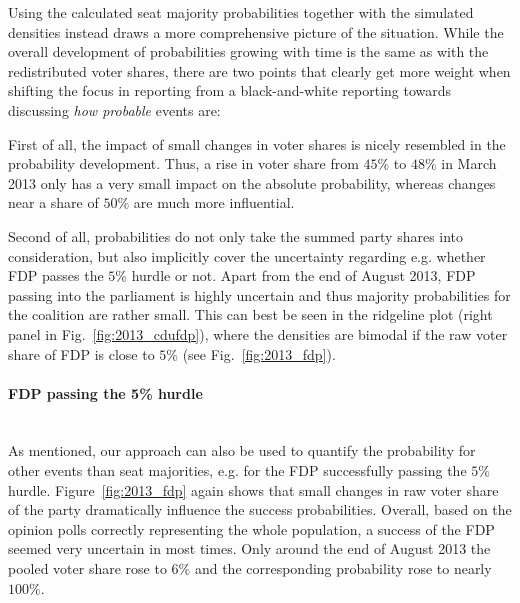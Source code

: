 \documentclass[smallcondensed]{svjour3}     %
\begin{document}
Using the calculated seat majority probabilities together with
the simulated densities instead draws a more comprehensive picture
of the situation. While the overall development of probabilities
growing with time is the same as with the redistributed voter shares,
there are two points that clearly get more weight when shifting 
the focus in reporting from a black-and-white reporting towards
discussing {\it how probable} events are:

First of all, the impact of small changes in voter shares is nicely resembled
in the probability development. Thus, a rise in voter share from $45\%$ to 
$48\%$ in March 2013 only has a very small impact on the absolute
probability, whereas changes near a share of $50\%$ are much more influential.

Second of all, probabilities do not only take the summed party
shares into consideration, but also implicitly cover the 
uncertainty regarding e.g. whether FDP passes the $5\%$ hurdle
or not. Apart from the end of August 2013, FDP passing into the
parliament is highly uncertain and thus majority probabilities for
the coalition are rather small. This can best be seen in the
ridgeline plot (right panel in Fig.~\ref{fig:2013_cdufdp}), where
the densities are bimodal if the raw voter share of FDP is close
to $5\%$ (see Fig.~\ref{fig:2013_fdp}).


\paragraph{FDP passing the 5\% hurdle} \ \\
As mentioned, our approach can also be used to quantify the probability
for other events than seat majorities, e.g. for the FDP successfully
passing the $5\%$ hurdle. Figure~\ref{fig:2013_fdp} again shows that
small changes in raw voter share of the party dramatically influence
the success probabilities. Overall, based on the opinion polls
correctly representing the whole population, a success of the FDP seemed
very uncertain in most times. Only around the end of August 2013
the pooled voter share rose to $6\%$ and the corresponding probability
rose to nearly $100\%$.
\end{document}
